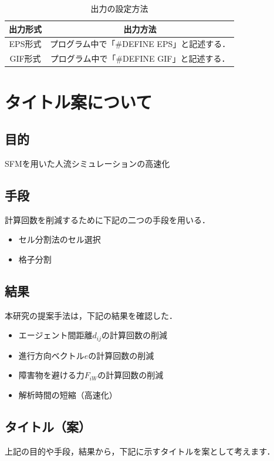\begin{table}[t]
  \begin{center}
    \caption{出力の設定方法}
    \label{tb:toggle_outputs}
    \begin{tabular}{c|c}
      \hline \hline
      出力形式 & 出力方法 \\ \hline
      EPS形式  & プログラム中で「\#DEFINE EPS」と記述する．\\ \hline
      GIF形式  & プログラム中で「\#DEFINE GIF」と記述する．\\ \hline
    \end{tabular}
  \end{center}
\end{table}

\chapter{タイトル案について}
\clearpage
\section{目的}
SFMを用いた人流シミュレーションの高速化

\section{手段}
計算回数を削減するために下記の二つの手段を用いる．
 
\begin{itemize}
\item セル分割法のセル選択
\item 格子分割
\end{itemize}

\section{結果}
本研究の提案手法は，下記の結果を確認した．

\begin{itemize}
\item エージェント間距離$d_{ij}$の計算回数の削減
\item 進行方向ベクトル$e$の計算回数の削減
\item 障害物を避ける力$F_{iW}$の計算回数の削減
\item 解析時間の短縮（高速化）
\end{itemize}

\section{タイトル（案）}
上記の目的や手段，結果から，下記に示すタイトルを案として考えます．

